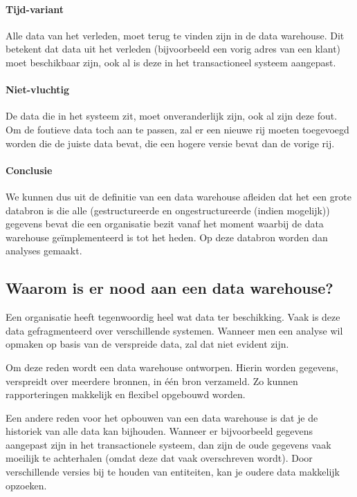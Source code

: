 \paragraph{Tijd-variant}
Alle data van het verleden, moet terug te vinden zijn in de data warehouse. Dit betekent dat data uit het verleden (bijvoorbeeld een vorig adres van een klant) moet beschikbaar zijn, ook al is deze in het transactioneel systeem aangepast.

\paragraph{Niet-vluchtig}
De data die in het systeem zit, moet onveranderlijk zijn, ook al zijn deze fout. Om de foutieve data toch aan te passen, zal er een nieuwe rij moeten toegevoegd worden die de juiste data bevat, die een hogere versie bevat dan de vorige rij. 

\paragraph{Conclusie}
We kunnen dus uit de definitie van een data warehouse afleiden dat het een grote databron is die alle (gestructureerde en ongestructureerde (indien mogelijk)) gegevens bevat die een organisatie bezit vanaf het moment waarbij de data warehouse geïmplementeerd is tot het heden. Op deze databron worden dan analyses gemaakt.

\subsection{Waarom is er nood aan een data warehouse?}
Een organisatie heeft tegenwoordig heel wat data ter beschikking. Vaak is deze data gefragmenteerd over verschillende systemen. Wanneer men een analyse wil opmaken op basis van de verspreide data, zal dat niet evident zijn. 

Om deze reden wordt een data warehouse ontworpen. Hierin worden gegevens, verspreidt over meerdere bronnen, in één bron verzameld. Zo kunnen rapporteringen makkelijk en flexibel opgebouwd worden. 

Een andere reden voor het opbouwen van een data warehouse is dat je de historiek van alle data kan bijhouden. Wanneer er bijvoorbeeld gegevens aangepast zijn in het transactionele systeem, dan zijn de oude gegevens vaak moeilijk te achterhalen (omdat deze dat vaak overschreven wordt). Door verschillende versies bij te houden van entiteiten, kan je oudere data makkelijk opzoeken.

